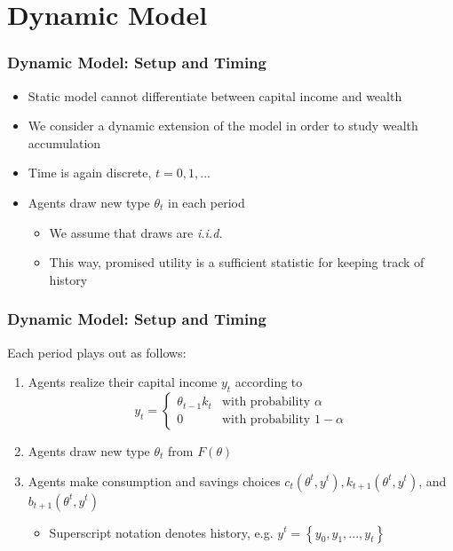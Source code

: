 \documentclass{beamer}
\begin{document}
\section{Dynamic Model}

\begin{frame}
    \frametitle{Dynamic Model: Setup and Timing}

    \begin{itemize}
        \item Static model cannot differentiate between capital income and wealth 
        \item We consider a dynamic extension of the model in order to study wealth accumulation
        \item Time is again discrete, \( t=0,1,... \)
        \item Agents draw new type \( \theta_t \) in each period
        \begin{itemize}
            \item We assume that draws are \textit{i.i.d.}
            \item This way, promised utility is a sufficient statistic for keeping track of history
        \end{itemize}
    \end{itemize}

\end{frame}

\begin{frame}
    \frametitle{Dynamic Model: Setup and Timing}

    Each period plays out as follows:
    \begin{enumerate}
        \item Agents realize their capital income \( y_t \) according to 
        \begin{equation} \label{eqn:dyn_yt}
            y_{t}=\begin{cases}
                \theta_{t-1}k_{t} & \text{with probability }\alpha\\
                0 & \text{with probability } 1-\alpha
                \end{cases}
        \end{equation}
        \item Agents draw new type \( \theta_t \) from \( F\left( \theta \right) \)
        \item Agents make consumption and savings choices \( c_{t}\left(\theta^{t},y^{t}\right),k_{t+1}\left(\theta^{t},y^{t}\right) \), and \( b_{t+1}\left(\theta^{t},y^{t}\right) \)
        \begin{itemize}
            \item Superscript notation denotes history, e.g. \( y^t = \left\{ y_0, y_1,...,y_t\right\} \)
        \end{itemize}
    \end{enumerate}

\end{frame}
\end{document}
